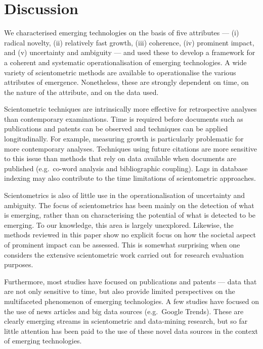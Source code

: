 \documentclass[11pt]{article}
\begin{document}
\section{Discussion}
We characterised emerging technologies on the basis of five attributes --- (i) radical novelty, (ii) relatively fast growth, (iii) coherence, (iv) prominent impact, and (v) uncertainty and ambiguity --- and used these to develop a framework for a coherent and systematic operationalisation of emerging technologies. A wide variety of scientometric methods are available to operationalise the various attributes of emergence. Nonetheless, these are strongly dependent on time, on the nature of the attribute, and on the data used. 

Scientometric techniques are intrinsically more effective for retrospective analyses than contemporary examinations. Time is required before documents such as publications and patents can be observed and techniques can be applied longitudinally. For example, measuring growth is particularly problematic for more contemporary analyses. Techniques using future citations are more sensitive to this issue than methods that rely on data available when documents are published (e.g.\ co-word analysis and bibliographic coupling). Lags in database indexing may also contribute to the time limitations of scientometric approaches. 

Scientometrics is also of little use in the operationalisation of uncertainty and ambiguity. The focus of scientometrics has been mainly on the detection of what is emerging, rather than on characterising the potential of what is detected to be emerging.  To our knowledge, this area is largely unexplored. Likewise, the methods reviewed in this paper show no explicit focus on how the societal aspect of prominent impact can be assessed. This is somewhat surprising when one considers the extensive scientometric work carried out for research evaluation purposes.

Furthermore, most studies have focused on publications and patents --- data that are not only sensitive to time, but also provide limited perspectives on the multifaceted phenomenon of emerging technologies. A few studies have focused on the use of news articles and big data sources (e.g.\ Google Trends). These are clearly emerging streams in scientometric and data-mining research, but so far little attention has been paid to the use of these novel data sources in the context of emerging technologies. 
\end{document}
